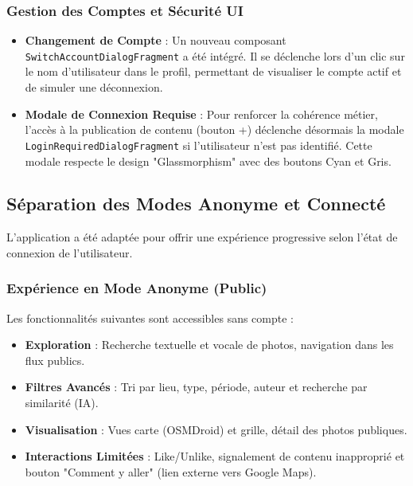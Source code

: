 \documentclass{article}
\begin{document}
\subsubsection{Gestion des Comptes et Sécurité UI}
\begin{itemize}
    \item \textbf{Changement de Compte} : Un nouveau composant \texttt{SwitchAccountDialogFragment} a été intégré. Il se déclenche lors d'un clic sur le nom d'utilisateur dans le profil, permettant de visualiser le compte actif et de simuler une déconnexion.
    \item \textbf{Modale de Connexion Requise} : Pour renforcer la cohérence métier, l'accès à la publication de contenu (bouton +) déclenche désormais la modale \texttt{LoginRequiredDialogFragment} si l'utilisateur n'est pas identifié. Cette modale respecte le design "Glassmorphism" avec des boutons Cyan et Gris.
\end{itemize}

\subsection{Séparation des Modes Anonyme et Connecté}
L'application a été adaptée pour offrir une expérience progressive selon l'état de connexion de l'utilisateur.

\subsubsection{Expérience en Mode Anonyme (Public)}
Les fonctionnalités suivantes sont accessibles sans compte :
\begin{itemize}
    \item \textbf{Exploration} : Recherche textuelle et vocale de photos, navigation dans les flux publics.
    \item \textbf{Filtres Avancés} : Tri par lieu, type, période, auteur et recherche par similarité (IA).
    \item \textbf{Visualisation} : Vues carte (OSMDroid) et grille, détail des photos publiques.
    \item \textbf{Interactions Limitées} : Like/Unlike, signalement de contenu inapproprié et bouton "Comment y aller" (lien externe vers Google Maps).
\end{itemize}
\end{document}
